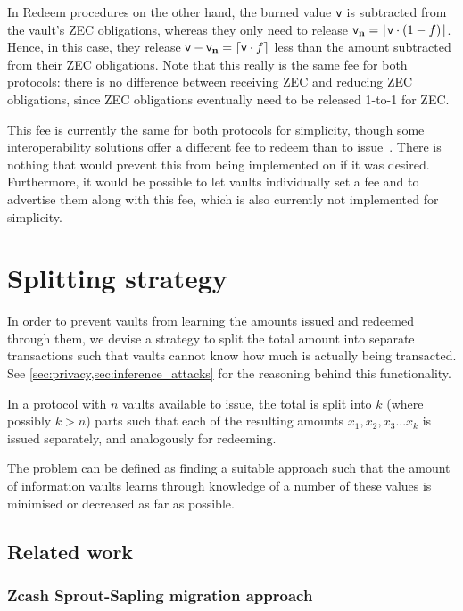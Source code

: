 In Redeem procedures on the other hand, the burned value $\mathsf{v}$ is subtracted from the vault's ZEC obligations, whereas they only need to release $\valn = \left \lfloor{\val \cdot (1 - f)}\right \rfloor$.
Hence, in this case, they release $\val - \valn = \left \lceil{\val \cdot f}\right \rceil$ less than the amount subtracted from their ZEC obligations.
Note that this really is the same fee for both protocols: there is no difference between receiving ZEC and reducing ZEC obligations, since ZEC obligations eventually need to be released 1-to-1 for ZEC.

This fee is currently the same for both protocols for simplicity, though some interoperability solutions offer a different fee to redeem than to issue~\cite{RenBridgeFAQDarknodes-2020-12-08}.
There is nothing that would prevent this from being implemented on \zclaim if it was desired.
Furthermore, it would be possible to let vaults individually set a fee and to advertise them along with this fee, which is also currently not implemented for simplicity.


\section{Splitting strategy}
\label{sec:splitting_strategy}

In order to prevent vaults from learning the amounts issued and redeemed through them, we devise a strategy to split the total amount into separate transactions such that vaults cannot know how much is actually being transacted.
See \cref{sec:privacy,sec:inference_attacks} for the reasoning behind this functionality.

In a protocol with $n$ vaults available to issue, the total \vtot is split into $k$ (where possibly $k > n$) parts such that each of the resulting amounts $x_1, x_2, x_3 ... x_k$ is issued separately, and analogously for redeeming.

The problem can be defined as finding a suitable approach such that the amount of information vaults learns through knowledge of a number of these values is minimised or decreased as far as possible.

\subsection{Related work}

\subsubsection{Zcash Sprout-Sapling migration approach}

